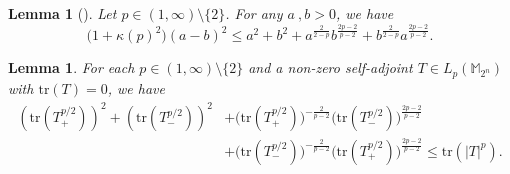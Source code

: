\documentclass{amsbook}
\newtheorem{lemma}[theorem]{Lemma}
\theoremstyle{definition}
\theoremstyle{remark}
\numberwithin{section}{chapter}
\numberwithin{equation}{chapter}
\newcommand{\1}{\mathbf{1}}
\begin{document}
\begin{lemma}[{\cite[Lemma 2.2 and Remark 3.2]{HMO2017}}]\label{ab-k-p} 
Let $p\in(1,\infty)\setminus\{2\}$. For any $a~,b>0$, we have
\[
\bigl(1 + \kappa(p)^2\bigr)(a - b)^2 \leq a^2 + b^2 + a^{\frac{2}{2-p}}b^{\frac{2p-2}{p-2}} + b^{\frac{2}{2-p}}a^{\frac{2p-2}{p-2}}.
\]
\end{lemma}

\begin{lemma}\label{t-p}
For each $p\in(1,\infty)\setminus\{2\}$ and a non-zero self-adjoint $ T\in L_p(\mathbb{M}_{2^n})$ with $\mathrm{tr}(T)=0$, we have
\begin{align*}
(\mathrm{tr}(T_+^{p/2}))^2 + (\mathrm{tr}(T_-^{p/2}))^2&+ \big(\mathrm{tr}(T_+^{p/2})\big)^{-\frac{2}{p-2}} \bigl(\mathrm{tr}(T_-^{p/2})\bigr)^{\frac{2p-2}{p-2}}\\
&+ \bigl(\mathrm{tr}(T_-^{p/2})\bigr)^{-\frac{2}{p-2}} \bigl(\mathrm{tr}(T_+^{p/2})\bigr)^{\frac{2p-2}{p-2}} \leq \mathrm{tr}(|T|^p).
\end{align*}
\end{lemma}
\end{document}
